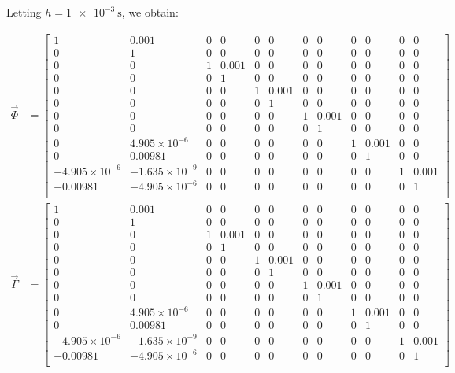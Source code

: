 Letting $h = \SI{1e-3}{\second}$, we obtain:

\begin{equation}
\begin{split}
	\vec{\Phi} &= 
	\begin{bmatrix}
		1 & 0.001 & 0 & 0 & 0 & 0 & 0 & 0 & 0 & 0 & 0 & 0 \\
		0 & 1 & 0 & 0 & 0 & 0 & 0 & 0 & 0 & 0 & 0 & 0 \\
		0 & 0 & 1 & 0.001 & 0 & 0 & 0 & 0 & 0 & 0 & 0 & 0 \\
		0 & 0 & 0 & 1 & 0 & 0 & 0 & 0 & 0 & 0 & 0 & 0 \\
		0 & 0 & 0 & 0 & 1 & 0.001 & 0 & 0 & 0 & 0 & 0 & 0 \\
		0 & 0 & 0 & 0 & 0 & 1 & 0 & 0 & 0 & 0 & 0 & 0 \\
		0 & 0 & 0 & 0 & 0 & 0 & 1 & 0.001 & 0 & 0 & 0 & 0 \\
		0 & 0 & 0 & 0 & 0 & 0 & 0 & 1 & 0 & 0 & 0 & 0 \\
		0 & 4.905\times10^{-6} & 0 & 0 & 0 & 0 & 0 & 0 & 1 & 0.001 & 0 & 0
		\\
		0 & 0.00981 & 0 & 0 & 0 & 0 & 0 & 0 & 0 & 1 & 0 & 0 \\
		-4.905\times10^{-6} & -1.635\times10^{-9} & 0
		& 0 & 0 & 0 & 0 & 0 & 0 & 0 & 1 & 0.001 \\
		-0.00981 & -4.905\times10^{-6} & 0 & 0 & 0 & 0 & 0 & 0 & 0 & 0 & 0
		& 1 \\
	\end{bmatrix} \\
	\vec{\Gamma} &= 
	\begin{bmatrix}
		1 & 0.001 & 0 & 0 & 0 & 0 & 0 & 0 & 0 & 0 & 0 & 0 \\
		0 & 1 & 0 & 0 & 0 & 0 & 0 & 0 & 0 & 0 & 0 & 0 \\
		0 & 0 & 1 & 0.001 & 0 & 0 & 0 & 0 & 0 & 0 & 0 & 0 \\
		0 & 0 & 0 & 1 & 0 & 0 & 0 & 0 & 0 & 0 & 0 & 0 \\
		0 & 0 & 0 & 0 & 1 & 0.001 & 0 & 0 & 0 & 0 & 0 & 0 \\
		0 & 0 & 0 & 0 & 0 & 1 & 0 & 0 & 0 & 0 & 0 & 0 \\
		0 & 0 & 0 & 0 & 0 & 0 & 1 & 0.001 & 0 & 0 & 0 & 0 \\
		0 & 0 & 0 & 0 & 0 & 0 & 0 & 1 & 0 & 0 & 0 & 0 \\
		0 & 4.905\times10^{-6} & 0 & 0 & 0 & 0 & 0 & 0 & 1 & 0.001 & 0 & 0
		\\
		0 & 0.00981 & 0 & 0 & 0 & 0 & 0 & 0 & 0 & 1 & 0 & 0 \\
		-4.905\times10^{-6} & -1.635\times10^{-9} & 0
		& 0 & 0 & 0 & 0 & 0 & 0 & 0 & 1 & 0.001 \\
		-0.00981 & -4.905\times10^{-6} & 0 & 0 & 0 & 0 & 0 & 0 & 0 & 0 & 0
		& 1 \\
	\end{bmatrix} 
\end{split}
\end{equation}